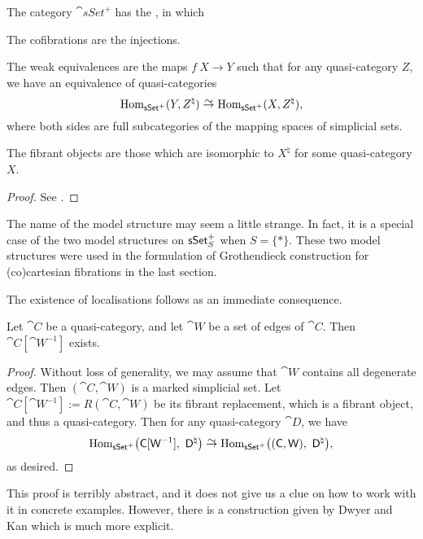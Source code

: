 \begin{theorem}
    The category $\cat{sSet}^+$ has the , in which
    \begin{itms}
        \item The cofibrations are the injections.
        \item The weak equivalences are the maps $f\:X\to Y$
        such that for any quasi-category $Z$, we have an equivalence of quasi-categories
        \[ \Hom_{\cat{sSet}^+}(Y,Z^\natural) \simto \Hom_{\cat{sSet}^+}(X,Z^\natural), \]
        where both sides are full subcategories of the mapping spaces of simplicial sets.
        \item The fibrant objects are those which are isomorphic to $X^\natural$
        for some quasi-category $X$.
    \end{itms}
\end{theorem}

\begin{proof}
    See \cite[Proposition~3.1.3.7]{htt}.
\end{proof}

The name of the model structure may seem a little strange.
In fact, it is a special case of the two model structures on $\mathsf{sSet}^+_{\/S}$
when $S=\{*\}$. These two model structures were used in the formulation 
of Grothendieck construction for (co)cartesian fibrations in the last section.

The existence of localisations follows as an immediate consequence.

\begin{corollary}
    Let $\cat{C}$ be a quasi-category,
    and let $\cat{W}$ be a set of edges of $\cat{C}$.
    Then $\cat{C}[\cat{W}^{-1}]$ exists.
\end{corollary}

\begin{proof}
    Without loss of generality, we may assume that $\cat{W}$ contains all degenerate edges.
    Then $(\cat{C},\cat{W})$ is a marked simplicial set.
    Let $\cat{C}[\cat{W}^{-1}]:=R(\cat{C},\cat{W})$ be its fibrant replacement,
    which is a fibrant object, and thus a quasi-category.
    Then for any quasi-category $\cat{D}$, we have 
    \[ \Hom_{\cat{sSet}^+}\bigl(\cat{C}[\cat{W}^{-1}],\ \cat{D}^\natural\bigr) \simto
       \Hom_{\cat{sSet}^+}\bigl((\cat{C},\cat{W}),\ \cat{D}^\natural\bigr), \]
    as desired.
\end{proof}

This proof is terribly abstract, and it does not give us a clue on 
how to work with it in concrete examples.
However, there is a construction given by Dwyer and Kan \cite{dk-calc} which is 
much more explicit.

